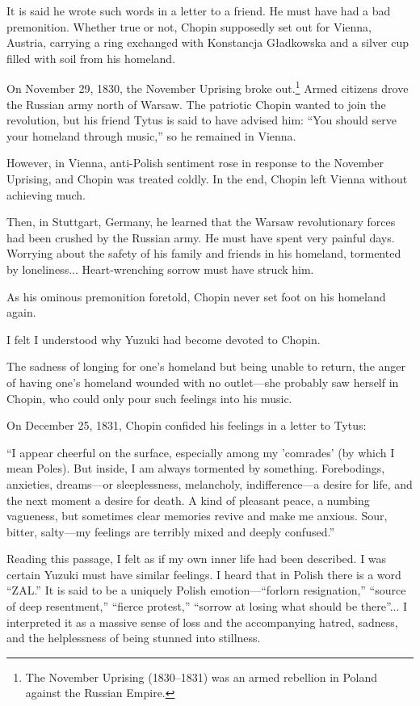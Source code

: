 \documentclass[
    a4paper,
    12pt,
    twoside,
    openany,
    UTF8,
    fontset=windows
]{ctexbook}
\begin{document}
It is said he wrote such words in a letter to a friend. He must have had a bad premonition. Whether true or not, Chopin supposedly set out for Vienna, Austria, carrying a ring exchanged with Konstancja Gładkowska and a silver cup filled with soil from his homeland.

On November 29, 1830, the November Uprising broke out.\footnote{The November Uprising (1830–1831) was an armed rebellion in Poland against the Russian Empire.} Armed citizens drove the Russian army north of Warsaw. The patriotic Chopin wanted to join the revolution, but his friend Tytus is said to have advised him: ``You should serve your homeland through music,'' so he remained in Vienna.

However, in Vienna, anti-Polish sentiment rose in response to the November Uprising, and Chopin was treated coldly. In the end, Chopin left Vienna without achieving much.

Then, in Stuttgart, Germany, he learned that the Warsaw revolutionary forces had been crushed by the Russian army. He must have spent very painful days. Worrying about the safety of his family and friends in his homeland, tormented by loneliness... Heart-wrenching sorrow must have struck him.

As his ominous premonition foretold, Chopin never set foot on his homeland again.

I felt I understood why Yuzuki had become devoted to Chopin.

The sadness of longing for one's homeland but being unable to return, the anger of having one's homeland wounded with no outlet---she probably saw herself in Chopin, who could only pour such feelings into his music.

On December 25, 1831, Chopin confided his feelings in a letter to Tytus:

``I appear cheerful on the surface, especially among my 'comrades' (by which I mean Poles). But inside, I am always tormented by something. Forebodings, anxieties, dreams---or sleeplessness, melancholy, indifference---a desire for life, and the next moment a desire for death. A kind of pleasant peace, a numbing vagueness, but sometimes clear memories revive and make me anxious. Sour, bitter, salty---my feelings are terribly mixed and deeply confused.''

Reading this passage, I felt as if my own inner life had been described. I was certain Yuzuki must have similar feelings. I heard that in Polish there is a word ``ZAL.'' It is said to be a uniquely Polish emotion---``forlorn resignation,'' ``source of deep resentment,'' ``fierce protest,'' ``sorrow at losing what should be there''... I interpreted it as a massive sense of loss and the accompanying hatred, sadness, and the helplessness of being stunned into stillness.
\end{document}
